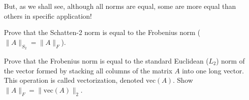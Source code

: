 \documentclass[11pt]{article}
\newcommand{\qn}[1]{\todo[inline, color=brown!30]{Quynh: #1}}
\begin{document}
But, as we shall see, although all norms are equal, some are more equal than others in specific application!

\begin{exercise}
Prove that the Schatten-2 norm is equal to the Frobenius norm ($\|A\|_{S_2} = \|A\|_F$).
\end{exercise}

\begin{exercise}
Prove that the Frobenius norm is equal to the standard Euclidean ($L_2$) norm of the vector formed by stacking all columns of the matrix $A$ into one long vector. This operation is called vectorization, denoted $\text{vec}(A)$. Show $\|A\|_F = \|\text{vec}(A)\|_2$.
\end{exercise}














\end{document}
